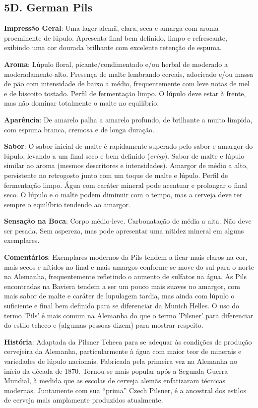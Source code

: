 \subsection*{5D. German Pils}
\textbf{Impressão Geral}: Uma lager alemã, clara, seca e amarga com aroma proeminente de lúpulo. Apresenta final bem definido, limpo e refrescante, exibindo uma cor dourada brilhante com excelente retenção de espuma.

\textbf{Aroma}: Lúpulo floral, picante/condimentado e/ou herbal de moderado a moderadamente-alto. Presença de malte lembrando cereais, adocicado e/ou massa de pão com intensidade de baixo a médio, frequentemente com leve notas de mel e de biscoito tostado. Perfil de fermentação limpo. O lúpulo deve estar à frente, mas não dominar totalmente o malte no equilíbrio.

\textbf{Aparência}: De amarelo palha a amarelo profundo, de brilhante a muito límpida, com espuma branca, cremosa e de longa duração.

\textbf{Sabor}: O sabor inicial de malte é rapidamente superado pelo sabor e amargor do lúpulo, levando a um final seco e bem definido (\textit{crisp}). Sabor de malte e lúpulo similar ao aroma (mesmos descritores e intensidades). Amargor de médio a alto, persistente no retrogosto junto com um toque de malte e lúpulo. Perfil de fermentação limpo. Água com caráter mineral pode acentuar e prolongar o final seco. O lúpulo e o malte podem diminuir com o tempo, mas a cerveja deve ter sempre o equilíbrio tendendo ao amargor.

\textbf{Sensação na Boca}: Corpo médio-leve. Carbonatação de média a alta. Não deve ser pesada. Sem aspereza, mas pode apresentar uma nitidez mineral em alguns exemplares.

\textbf{Comentários}: Exemplares modernos da Pils tendem a ficar mais claros na cor, mais secos e nítidos no final e mais amargos conforme se move do sul para o norte na Alemanha, frequentemente refletindo o aumento de sulfatos na água. As Pils encontradas na Baviera tendem a ser um pouco mais suaves no amargor, com mais sabor de malte e caráter de lupulagem tardia, mas ainda com lúpulo o suficiente e final bem definido para se diferenciar da Munich Helles. O uso do termo 'Pils' é mais comum na Alemanha do que o termo 'Pilsner' para diferenciar do estilo tcheco e (algumas pessoas dizem) para mostrar respeito.

\textbf{História}: Adaptada da Pilsner Tcheca para se adequar às condições de produção cervejeira da Alemanha, particularmente à água com maior teor de minerais e variedades de lúpulo nacionais. Fabricada pela primeira vez na Alemanha no início da década de 1870. Tornou-se mais popular após a Segunda Guerra Mundial, à medida que as escolas de cerveja alemãs enfatizaram técnicas modernas. Juntamente com sua “prima” Czech Pilsner, é a ancestral dos estilos de cerveja mais amplamente produzidos atualmente.

